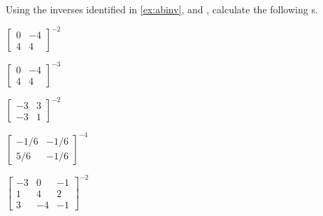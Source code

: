 \begin{exercise}  
Using the inverses identified in \cref{ex:abinv}, and , calculate the following s.
\begin{Parts}
\item \(\begin{bmatrix} 0&-4\\4&4 \end{bmatrix}^{-2}\)

\begin{reduce}
\item \(\begin{bmatrix} 0&-4\\4&4 \end{bmatrix}^{-3}\)

\item \(\begin{bmatrix} -3&3
\\-3&1 \end{bmatrix}^{-2}\)
\end{reduce}

\item \(\begin{bmatrix} -1/6&-1/6
\\5/6&-1/6 \end{bmatrix}^{-4}\)

\begin{reduce}
\item \(\begin{bmatrix} -3&0&-1
\\1&4&2
\\3&-4&-1 \end{bmatrix}^{-2}\)
\end{reduce}


\end{Parts}
\end{exercise}
